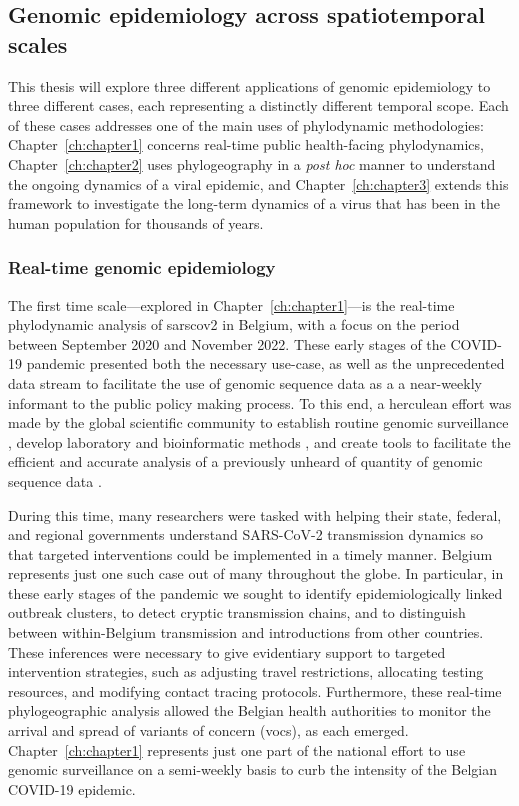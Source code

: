 \subsection{Genomic epidemiology across spatiotemporal scales}
This thesis will explore three different applications of genomic epidemiology to three different cases, each representing a distinctly different temporal scope.
Each of these cases addresses one of the main uses of phylodynamic methodologies: Chapter~\ref{ch:chapter1} concerns real-time public health-facing phylodynamics, Chapter~\ref{ch:chapter2} uses phylogeography in a \textit{post hoc} manner to understand the ongoing dynamics of a viral epidemic, and Chapter~\ref{ch:chapter3} extends this framework to investigate the long-term dynamics of a virus that has been in the human population for thousands of years.

\subsubsection{Real-time genomic epidemiology}
The first time scale---explored in Chapter~\ref{ch:chapter1}---is the real-time phylodynamic analysis of \gls{sarscov2} in Belgium, with a focus on the period between September 2020 and November 2022.
These early stages of the COVID-19 pandemic presented both the necessary use-case, as well as the unprecedented data stream to facilitate the use of genomic sequence data as a a near-weekly informant to the public policy making process.
To this end, a herculean effort was made by the global scientific community to establish routine genomic surveillance \citep{smith2020integrated,deng2020genomic,tegally2022evolving}, develop laboratory and bioinformatic methods \citep{wang2020establishment,tyson2020improvements,chiara2021next}, and create tools to facilitate the efficient and accurate analysis of a previously unheard of quantity of genomic sequence data \citep{shu2017gisaid,minh2020iq,aksamentov2021nextclade}.

During this time, many researchers were tasked with helping their state, federal, and regional governments understand SARS-CoV-2 transmission dynamics so that targeted interventions could be implemented in a timely manner.
Belgium represents just one such case out of many throughout the globe.
In particular, in these early stages of the pandemic we sought to identify epidemiologically linked outbreak clusters, to detect cryptic transmission chains, and to distinguish between within-Belgium transmission and introductions from other countries.
These inferences were necessary to give evidentiary support to targeted intervention strategies, such as adjusting travel restrictions, allocating testing resources, and modifying contact tracing protocols.
Furthermore, these real-time phylogeographic analysis allowed the Belgian health authorities to monitor the arrival and spread of variants of concern (\gls{voc}s), as each emerged.
Chapter~\ref{ch:chapter1} represents just one part of the national effort to use genomic surveillance on a semi-weekly basis to curb the intensity of the Belgian COVID-19 epidemic.

